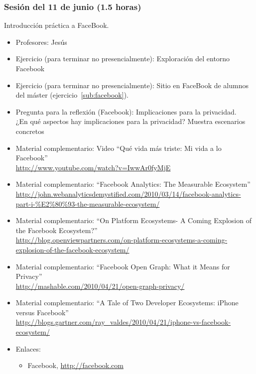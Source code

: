\documentclass[a4paper,12pt]{article}
\begin{document}
\subsubsection{Sesión del 11 de junio (1.5 horas)}

Introducción práctica a FaceBook.

\begin{itemize}
\item Profesores: Jesús
\item Ejercicio (para terminar no presencialmente): Exploración del entorno Facebook
\item Ejercicio (para terminar no presencialmente): Sitio en FaceBook de alumnos del máster (ejercicio~\ref{sub:facebook}).

\item Pregunta para la reflexión (Facebook): Implicaciones para la privacidad. \\
  ¿En qué aspectos hay implicaciones para la privacidad? Muestra escenarios concretos

\item Material complementario: Video ``Qué vida más triste: Mi vida a lo Facebook'' \\
\url{http://www.youtube.com/watch?v=IwwAr0fyMjE}
\item Material complementario: ``Facebook Analytics: The Measurable Ecosystem'' \\
  \url{http://john.webanalyticsdemystified.com/2010/03/14/facebook-analytics-part-i-%E2%80%93-the-measurable-ecosystem/}
\item Material complementario: ``On Platform Ecosystems- A Coming Explosion of the Facebook Ecosystem?''\\
  \url{http://blog.openviewpartners.com/on-platform-ecosystems-a-coming-explosion-of-the-facebook-ecosystem/}
\item Material complementario: ``Facebook Open Graph: What it Means for Privacy'' \\
  \url{http://mashable.com/2010/04/21/open-graph-privacy/}
\item Material complementario: ``A Tale of Two Developer Ecosystems: iPhone versus Facebook'' \\
  \url{http://blogs.gartner.com/ray_valdes/2010/04/21/iphone-vs-facebook-ecosystem/}
\item Enlaces:
  \begin{itemize}
  \item Facebook, \url{http://facebook.com}
  \end{itemize}
\end{itemize}
\end{document}

